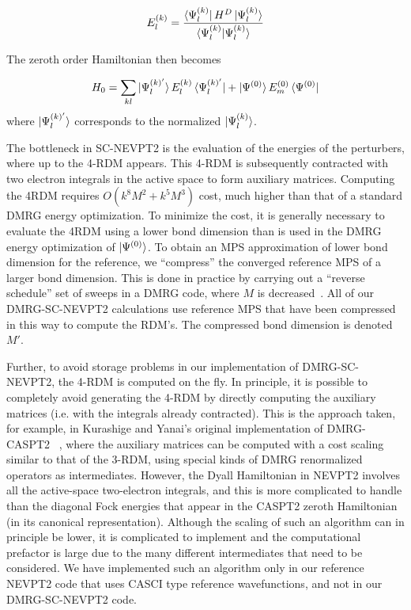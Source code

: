 \begin{equation}
  E^{(k)}_l = \frac{\bra{\Psi^{(k)}_l}H^D\ket{\Psi^{(k)}_l}}{\braket{\Psi^{(k)}_l|\Psi^{(k)}_l}}
\end{equation}

The zeroth order Hamiltonian then becomes

\begin{equation}
  H_0 = \sum_{kl} \ket{\Psi^{(k)'}_l}E^{(k)}_l \bra{\Psi^{(k)'}_l} +\ket{\Psi^{(0)}}E^{(0)}_m \bra{\Psi^{(0)}}
\end{equation}
where $\ket{\Psi^{(k)'}_l}$ corresponds to the normalized $\ket{\Psi^{(k)}_l}$.

The bottleneck in SC-NEVPT2 is the evaluation of the energies of the perturbers, 
where up to the 4-RDM appears. This 4-RDM is subsequently contracted with 
two electron integrals in the active space to form auxiliary matrices.\cite{ angeli_n-electron_2002} 
Computing the 4RDM requires $O(k^8M^2+k^5M^3)$ cost, much higher than that of a standard DMRG energy optimization.
To minimize the cost, it is generally necessary to evaluate the 4RDM using a lower bond dimension than is used in the DMRG energy optimization of $\ket{\Psi^{(0)}}$.
To obtain an MPS approximation of lower bond dimension for the reference, 
we  ``compress'' the converged reference MPS of a larger bond dimension.
 This is done in practice by carrying out a ``reverse schedule'' set of sweeps
in a DMRG code, where $M$ is decreased~\cite{olivares-amaya_ab-initio_2015}. All of our DMRG-SC-NEVPT2 calculations use reference MPS that have been 
compressed in this way to compute the RDM's. The compressed bond dimension is
denoted $M'$.

Further, to avoid storage problems in our implementation of DMRG-SC-NEVPT2, 
the 4-RDM is computed on the fly. In principle, it is possible to 
completely avoid generating the 4-RDM by directly computing the auxiliary matrices (i.e. with the integrals already contracted). 
This is the approach taken, for example, in Kurashige and Yanai's original implementation of DMRG-CASPT2
~\cite{kurashige_second-order_2011}, where the auxiliary matrices can be computed with a cost scaling similar to that of the 3-RDM,
using special kinds of DMRG renormalized operators as intermediates. However, the Dyall Hamiltonian in NEVPT2 
involves all the active-space two-electron integrals, and this is more complicated to handle than the diagonal Fock energies that appear in the CASPT2 zeroth 
Hamiltonian (in its canonical representation). Although the scaling of such an algorithm can in principle be lower, it is complicated to implement
and the computational prefactor is large due to the many different intermediates that need to be considered. We have implemented
such an algorithm only in our reference NEVPT2 code that uses CASCI type reference wavefunctions, and not in our DMRG-SC-NEVPT2 code.

